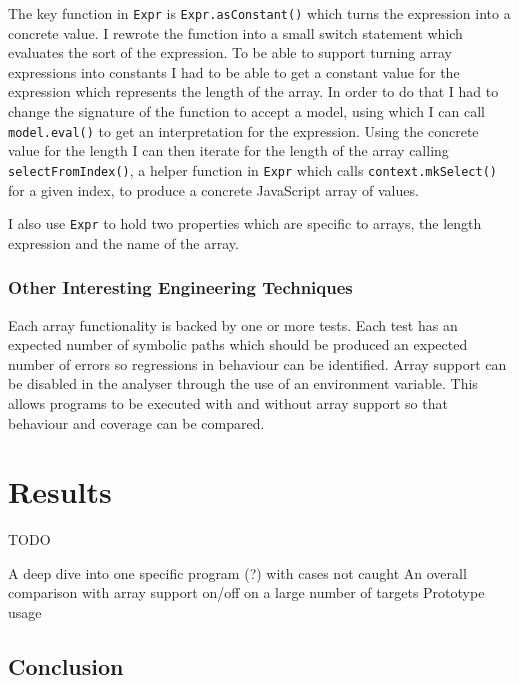 \documentclass[]{final_report}
\begin{document}
The key function in \lstinline{Expr} is \lstinline{Expr.asConstant()} which turns the expression into a concrete value. I rewrote the function into a small switch statement which evaluates the sort of the expression. To be able to support turning array expressions into constants I had to be able to get a constant value for the expression which represents the length of the array. In order to do that I had to change the signature of the function to accept a model, using which I can call \lstinline{model.eval()} to get an interpretation for the expression. Using the concrete value for the length I can then iterate for the length of the array calling \lstinline{selectFromIndex()}, a helper function in \lstinline{Expr} which calls \lstinline{context.mkSelect()} for a given index, to produce a concrete JavaScript array of values.

I also use \lstinline{Expr} to hold two properties which are specific to arrays, the length expression and the name of the array.

\subsection{Other Interesting Engineering Techniques}
Each array functionality is backed by one or more tests. Each test has an expected number of symbolic paths which should be produced an expected number of errors so regressions in behaviour can be identified. Array support can be disabled in the analyser through the use of an environment variable. This allows programs to be executed with and without array support so that behaviour and coverage can be compared.


\chapter{Results}

TODO

A deep dive into one specific program (?) with cases not caught
An overall comparison with array support on/off on a large number of targets
Prototype usage

\section{Conclusion}

\newpage


\label{endpage}
\end{document}
